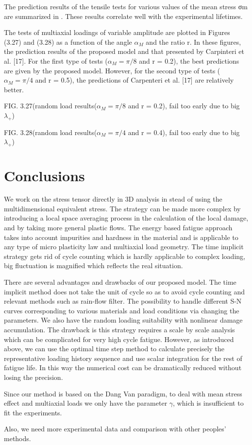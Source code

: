 The prediction results of the tensile tests for various values of the mean stress σm are summarized in . These results correlate well with the experimental lifetimes. 

The tests of multiaxial loadings of variable amplitude are plotted in Figures (3.27) and (3.28) as a function of the angle $\alpha_{M}$ and the ratio r. In these figures, the prediction results of the proposed model and that presented by Carpinteri et al. [17]. For the first type of tests ($\alpha_{M} = \pi/8$ and r = 0.2), the best predictions are given by the proposed model.
However, for the second type of tests ($\alpha_{M} = \pi/4$ and r = 0.5), the predictions of Carpenteri et al. [17] are relatively better.

FIG. 3.27(random load results($\alpha_{M} = \pi/8$ and r = 0.2), fail too early due to big $\lambda_+$)

FIG. 3.28(random load results($\alpha_{M} = \pi/4$ and r = 0.4), fail too early due to big $\lambda_+$)

\clearpage
\section{Conclusions}

We work on the stress tensor directly in 3D analysis in stead of using the multidimensional equivalent stress.
The strategy can be made more complex by introducing a local space averaging process in the calculation of the local damage, and by taking more general plastic flows. The energy based fatigue approach takes into account impurities and hardness in the material and is applicable to any type of micro plasticity law and multiaxial load geometry. The time implicit strategy gets rid of cycle counting which is hardly applicable to complex loading, big fluctuation is magnified which reflects the real situation.

There are several advantages and drawbacks of our proposed model. The time implicit method does not take the unit of cycle so as to avoid cycle counting and relevant methods such as rain-flow filter. The possibility to handle different S-N curves corresponding to various materials and load conditions via changing the parameters. We also have the random loading suitability with nonlinear damage accumulation. The drawback is this strategy requires a scale by scale analysis which can be complicated for very high cycle fatigue. However, as introduced above, we can use the optimal time step method to calculate precisely the representative loading history sequence and use scalar integration for the rest of fatigue life. In this way the numerical cost can be dramatically reduced without losing the precision.

Since our method is based on the Dang Van paradigm, to deal with mean stress effect and multiaxial loads we only have the parameter $\gamma$, which is insufficient to fit the experiments.

Also, we need more experimental data and comparison with other peoples' methods.









